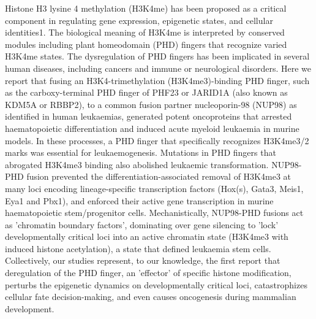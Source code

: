 \hisfourthree
Histone H3 lysine 4 methylation (H3K4me) has been proposed as a critical component in regulating gene expression, epigenetic states, and cellular identities1. The biological meaning of H3K4me is interpreted by conserved modules including plant homeodomain (PHD) fingers that recognize varied H3K4me states. The dysregulation of PHD fingers has been implicated in several human diseases, including cancers and immune or neurological disorders. Here we report that fusing an H3K4-trimethylation (H3K4me3)-binding PHD finger, such as the carboxy-terminal PHD finger of PHF23 or JARID1A (also known as KDM5A or RBBP2), to a common fusion partner nucleoporin-98 (NUP98) as identified in human leukaemias, generated potent oncoproteins that arrested haematopoietic differentiation and induced acute myeloid leukaemia in murine models. In these processes, a PHD finger that specifically recognizes H3K4me3/2 marks was essential for leukaemogenesis. Mutations in PHD fingers that abrogated H3K4me3 binding also abolished leukaemic transformation. NUP98-PHD fusion prevented the differentiation-associated removal of H3K4me3 at many loci encoding lineage-specific transcription factors (Hox(s), Gata3, Meis1, Eya1 and Pbx1), and enforced their active gene transcription in murine haematopoietic stem/progenitor cells. Mechanistically, NUP98-PHD fusions act as 'chromatin boundary factors', dominating over gene silencing to 'lock' developmentally critical loci into an active chromatin state (H3K4me3 with induced histone acetylation), a state that defined leukaemia stem cells. Collectively, our studies represent, to our knowledge, the first report that deregulation of the PHD finger, an 'effector' of specific histone modification, perturbs the epigenetic dynamics on developmentally critical loci, catastrophizes cellular fate decision-making, and even causes oncogenesis during mammalian development.\cite{Wang2009}
